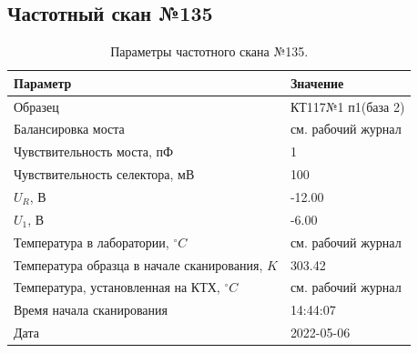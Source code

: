 \subsection{Частотный скан №135}
\begin{table}[!ht]
    \centering
    \caption{Параметры частотного скана №135.}
    \begin{tabular}{|l|l|}
        \hline
        Параметр                                       & Значение                  \\ \hline
        Образец                                        & КТ117№1 п1(база 2)        \\ \hline
        Балансировка моста                             & см. рабочий журнал        \\ \hline
        Чувствительность моста, пФ                     & 1                         \\ \hline
        Чувствительность селектора, мВ                 & 100                       \\ \hline
        $U_R$, В                                       & -12.00                    \\ \hline
        $U_1$, В                                       & -6.00                     \\ \hline
        Температура в лаборатории, $^\circ C$          & см. рабочий журнал        \\ \hline
        Температура образца в начале сканирования, $K$ & 303.42                    \\ \hline
        Температура, установленная на КТХ, $^\circ C$  & см. рабочий журнал        \\ \hline
        Время начала сканирования                      & 14:44:07                  \\ \hline
        Дата                                           & 2022-05-06                \\ \hline
    \end{tabular}
    \label{table:frequency_scan_135}
\end{table}

